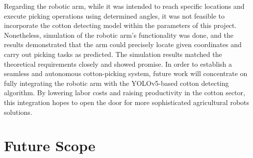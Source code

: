 \documentclass[12pt,a4paper]{report}
\begin{document}
\par Regarding the robotic arm, while it was intended to reach specific locations and execute picking operations using determined angles, it was not feasible to incorporate the cotton detecting model within the parameters of this project. Nonetheless, simulation of the robotic arm's functionality was done, and the results demonstrated that the arm could precisely locate given coordinates and carry out picking tasks as predicted. The simulation results matched the theoretical requirements closely and showed promise. In order to establish a seamless and autonomous cotton-picking system, future work will concentrate on fully integrating the robotic arm with the YOLOv5-based cotton detecting algorithm. By lowering labor costs and raising productivity in the cotton sector, this integration hopes to open the door for more sophisticated agricultural robots solutions.


\newpage

\section {Future Scope}
\end{document}
